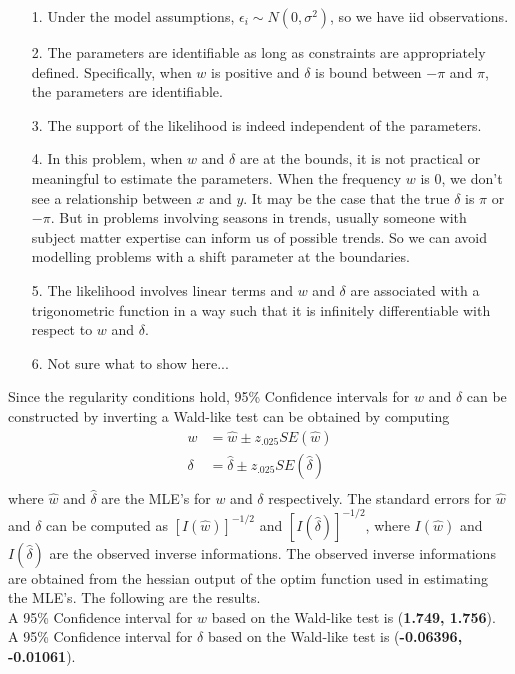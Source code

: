 \documentclass[11pt]{article}
\newcommand{\bk}[1]{\left[#1\right]}
\begin{document}
\begin{itemize}
  \item[1.]{Under the model assumptions, $\epsilon_i \sim N(0,\sigma^2)$, so we have iid observations.}
  \item[2.]{The parameters are identifiable as long as constraints are appropriately defined. Specifically, when $w$ is positive and $\delta$ is bound between $-\pi$ and $\pi$, the parameters are identifiable.}
  \item[3.]{The support of the likelihood is indeed independent of the parameters.}
  \item[4.]{In this problem, when $w$ and $\delta$ are at the bounds, it is not practical or meaningful to estimate the parameters. When the frequency $w$ is 0, we don't see a relationship between $x$ and $y$. It may be the case that the true $\delta$ is $\pi$ or $-\pi$. But in problems involving seasons in trends, usually someone with subject matter expertise can inform us of possible trends. So we can avoid modelling problems with a shift parameter at the boundaries.}
  \item[5.]{The likelihood involves linear terms and $w$ and $\delta$ are associated with a trigonometric function in a way such that it is infinitely differentiable with respect to $w$ and $\delta$.}
  \item[6.]{Not sure what to show here...}
\end{itemize}

\noindent
Since the regularity conditions hold, 95\% Confidence intervals for $w$ and
$\delta$ can be constructed by inverting a Wald-like test can be obtained by
computing
\[
\begin{aligned}
  w &= \hat w \pm z_{.025} SE(\hat w) \\
  \delta &= \hat \delta \pm z_{.025} SE(\hat \delta) \\
\end{aligned}
\]
where $\hat w$ and $\hat\delta$ are the MLE's for $w$ and $\delta$
respectively. The standard errors for $\hat w$ and $\delta$ can be computed as
$\bk{I(\hat w)}^{-1/2}$ and $\bk{I(\hat\delta)}^{-1/2}$, where $I(\hat w)$ and
$I(\hat \delta)$ are the observed inverse informations. The observed inverse
informations are obtained from the hessian output of the optim function used in
estimating the MLE's. The following are the results.\\

\noindent
A 95\% Confidence interval for $w$ based on the Wald-like test is (\textbf{1.749, 1.756}).\\
A 95\% Confidence interval for $\delta$ based on the Wald-like test is (\textbf{-0.06396, -0.01061}).
\end{document}

